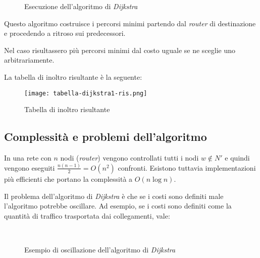 \begin{figure}[h!]
    \centering
    \hfill
    \caption{Esecuzione dell'algoritmo di \emph{Dijkstra}}
\end{figure}

\begin{note}
    Questo algoritmo costruisce i percorsi minimi partendo dal \emph{router} di
    destinazione e procedendo a ritroso sui predecessori.
\end{note}
\begin{note}
    Nel caso risultassero più percorsi minimi dal costo uguale se ne sceglie uno
    arbitrariamente.
\end{note}

\newpage\noindent
La tabella di inoltro risultante è la seguente:
\begin{figure}[ht]
    \centering
    \texttt{[image: tabella-dijkstra1-ris.png]}
    \caption{Tabella di inoltro risultante}
\end{figure}

\subsection{Complessità e problemi dell'algoritmo}
In una rete con $n$ nodi (\emph{router}) vengono controllati tutti i nodi
$w\notin N'$ e quindi vengono eseguiti $\frac{n(n-1)}{2}=O(n^2)$ confronti.
Esistono tuttavia implementazioni più efficienti che portano la complessità a
$O(n\log n)$.

Il problema dell'algoritmo di \emph{Dijkstra} è che se i costi sono definiti male
l'algoritmo potrebbe oscillare. Ad esempio, se i costi sono definiti come la
quantità di traffico trasportata dai collegamenti, vale:

\begin{figure}[h!]
    \centering
    \hspace{3cm}
    \\
    \hspace{3cm}
    \caption{Esempio di oscillazione dell'algoritmo di \emph{Dijkstra}}
\end{figure}

